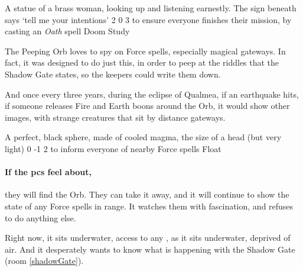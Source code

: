   {A statue of a brass woman, looking up and listening earnestly.
  The sign beneath says `tell me your intentions'}%
  {2}%
  {0}%
  {3}%
  {to ensure everyone finishes their mission, by casting an \textit{Oath} spell}%
  {Doom Study}%
  {
    \setcounter{Fate}{2}
    \setcounter{Water}{2}
    \setcounter{Empathy}{2}
    \setcounter{Wyldcrafting}{1}
  }%

\showStdSpells[
  \setcounter{diceNo}{0}
]


\begin{exampletext}
  The Peeping Orb loves to spy on Force spells, especially magical gateways.
  In fact, it was designed to do just this, in order to peep at the riddles that the Shadow Gate states, so the keepers could write them down.

  And once every three years, during the eclipse of Qualmea,%
  if an earthquake hits, if someone releases Fire and Earth \glspl{boon} around the Orb, it would show other images, with strange creatures that sit by distance gateways.
\end{exampletext}

\setcounter{wounds}{9}

  {A perfect, black sphere, made of cooled magma, the size of a head (but very light)}%
  {0}%
  {-1}%
  {2}%
  {to inform everyone of nearby Force spells}%
  {Float}%
  {
    \setcounter{Air}{3}
    \setcounter{Fire}{3}
    \setcounter{Earth}{1}
    \setcounter{Academics}{2}
    \setcounter{Xenomology}{2}
  }%

\setcounter{wounds}{0}

\showStdSpells[
  \setcounter{enc}{2}
  \findGatewaySpell
]

\paragraph{If the \glspl{pc} feel about,}
they will find the Orb.
They can take it away, and it will continue to show the state of any Force spells in range.
It watches them with fascination, and refuses to do anything else.

Right now, it sits underwater, access to any , as it sits underwater, deprived of air.
And it desperately wants to know what is happening with the Shadow Gate (room \vref{shadowGate}).

